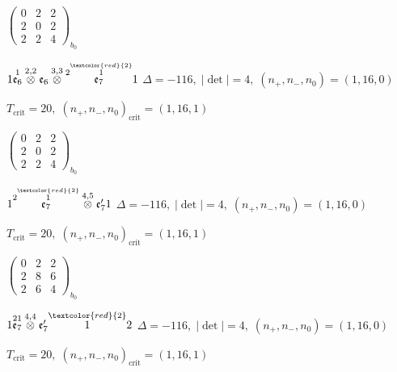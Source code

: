 \documentclass[10pt]{article}
\begin{document}
\hspace{2em}$\left(\begin{smallmatrix}0 & 2 & 2 \\ 2 & 0 & 2 \\ 2 & 2 & 4\end{smallmatrix}\right)_{\!b_0}$

\smallskip

$1\overset{1}{\mathfrak{e}_6}\overset{2,2}{\otimes}\mathfrak{e}_6\overset{3,3}{\otimes}\overset{2\overset{\textcolor{red}{2}}{1}}{\mathfrak{e}_7}1$ \quad $\Delta=-116,\; |\det|=4,\; (n_+,n_-,n_0)=(1,16,0)$

\hspace{1em}$T_{\text{crit}}=20,\; (n_+,n_-,n_0)_{\text{crit}}=(1,16,1)$

\hspace{2em}$\left(\begin{smallmatrix}0 & 2 & 2 \\ 2 & 0 & 2 \\ 2 & 2 & 4\end{smallmatrix}\right)_{\!b_0}$

\smallskip

$1\overset{2\overset{\textcolor{red}{2}}{1}}{\mathfrak{e}_7}\overset{4,5}{\otimes}\mathfrak{e}_7'1$ \quad $\Delta=-116,\; |\det|=4,\; (n_+,n_-,n_0)=(1,16,0)$

\hspace{1em}$T_{\text{crit}}=20,\; (n_+,n_-,n_0)_{\text{crit}}=(1,16,1)$

\hspace{2em}$\left(\begin{smallmatrix}0 & 2 & 2 \\ 2 & 8 & 6 \\ 2 & 6 & 4\end{smallmatrix}\right)_{\!b_0}$

\smallskip

$1\overset{21}{\mathfrak{e}_7}\overset{4,4}{\otimes}\mathfrak{e}_7'\overset{\textcolor{red}{2}}{1}2$ \quad $\Delta=-116,\; |\det|=4,\; (n_+,n_-,n_0)=(1,16,0)$

\hspace{1em}$T_{\text{crit}}=20,\; (n_+,n_-,n_0)_{\text{crit}}=(1,16,1)$
\end{document}
